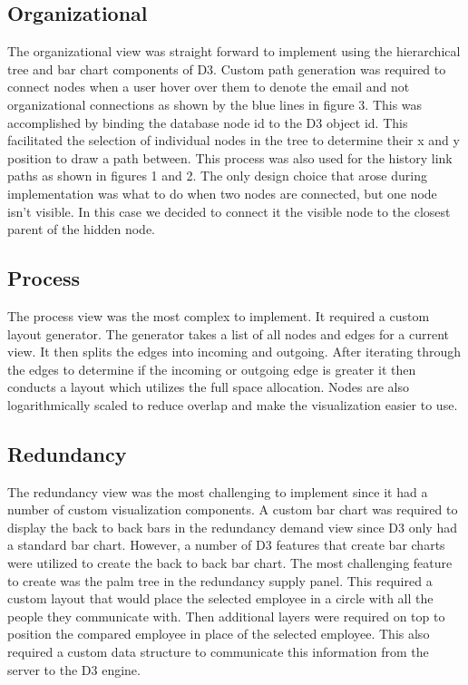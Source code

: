 \message{ !name(FinalPaper.tex)}\documentclass[journal]{vgtc}                %
\begin{document}
\subsection{Organizational}
The organizational view was straight forward to implement using the hierarchical tree and bar chart components of D3.  Custom path generation was required to connect nodes when a user hover over them to denote the email and not organizational connections as shown by the blue lines in figure 3.  This was accomplished by binding the database node id to the D3 object id.  This facilitated the selection of individual nodes in the tree to determine their x and y position to draw a path between.  This process was also used for the history link paths as shown in figures 1 and 2.
The only design choice that arose during implementation was what to do when two nodes are connected, but one node isn't visible.  In this case we decided to connect it the visible node to the closest parent of the hidden node.

\subsection{Process}
The process view was the most complex to implement.  It required a custom layout generator.  The generator takes a list of all nodes and edges for a current view.  It then splits the edges into incoming and outgoing.  After iterating through the edges to determine if the incoming or outgoing edge is greater it then conducts a layout which utilizes the full space allocation.  Nodes are also logarithmically scaled to reduce overlap and make the visualization easier to use.

\subsection{Redundancy}
The redundancy view was the most challenging to implement since it had a number of custom visualization components.  A custom bar chart was required to display the back to back bars in the redundancy demand view since D3 only had a standard bar chart.  However, a number of D3 features that create bar charts were utilized to create the back to back bar chart.  
The most challenging feature to create was the palm tree in the redundancy supply panel.  This required a custom layout that would place the selected employee in a circle with all the people they communicate with.  Then additional layers were required on top to position the compared employee in place of the selected employee.  This also required a custom data structure to communicate this information from the server to the D3 engine.
\end{document}

